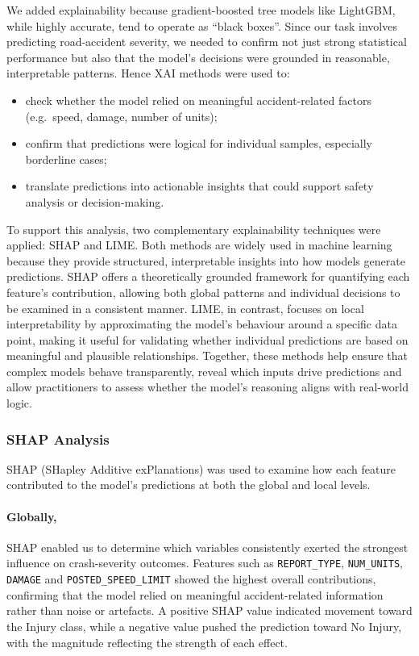 \documentclass[11pt,a4paper]{article}
\newcommand{\feat}[1]{\texttt{#1}}
\begin{document}
We added explainability because gradient-boosted tree models like LightGBM, while highly accurate,
tend to operate as ``black boxes''. Since our task involves predicting road-accident severity, we
needed to confirm not just strong statistical performance but also that the model's decisions were
grounded in reasonable, interpretable patterns. Hence XAI methods were used to:

\begin{itemize}
  \item check whether the model relied on meaningful accident-related factors (e.g.\ speed, damage,
    number of units);
  \item confirm that predictions were logical for individual samples, especially borderline cases;
  \item translate predictions into actionable insights that could support safety analysis or
    decision-making.
\end{itemize}

To support this analysis, two complementary explainability techniques were applied: SHAP and LIME.
Both methods are widely used in machine learning because they provide structured, interpretable
insights into how models generate predictions. SHAP offers a theoretically grounded framework for
quantifying each feature's contribution, allowing both global patterns and individual decisions to
be examined in a consistent manner. LIME, in contrast, focuses on local interpretability by
approximating the model's behaviour around a specific data point, making it useful for validating
whether individual predictions are based on meaningful and plausible relationships. Together, these
methods help ensure that complex models behave transparently, reveal which inputs drive predictions
and allow practitioners to assess whether the model's reasoning aligns with real-world logic.

\subsubsection{SHAP Analysis}

SHAP (SHapley Additive exPlanations) was used to examine how each feature contributed to the
model's predictions at both the global and local levels.

\paragraph{Globally,} SHAP enabled us to determine which variables consistently exerted the
strongest influence on crash-severity outcomes. Features such as \feat{REPORT\_TYPE},
\feat{NUM\_UNITS}, \feat{DAMAGE} and \feat{POSTED\_SPEED\_LIMIT} showed the highest overall
contributions, confirming that the model relied on meaningful accident-related information rather
than noise or artefacts. A positive SHAP value indicated movement toward the Injury class, while a
negative value pushed the prediction toward No Injury, with the magnitude reflecting the strength of
each effect.
\end{document}
